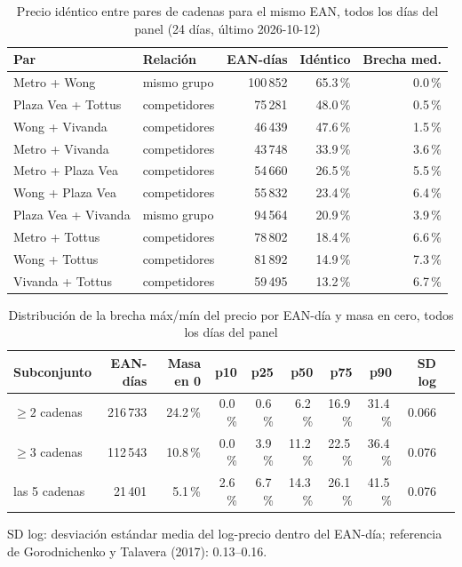 
\begin{table}[htbp]
\caption{Precio id\'entico entre pares de cadenas para el mismo EAN, todos los d\'ias del panel (24 d\'ias, \'ultimo 2026-10-12)}
\label{tab:identidad}
\centering\scriptsize\setlength{\tabcolsep}{3pt}
\begin{tabular}{@{}llrrr@{}}
\toprule
Par & Relaci\'on & EAN-d\'ias & Id\'entico & Brecha med. \\
\midrule
Metro + Wong & mismo grupo & 100\,852 & 65.3\,\% & 0.0\,\% \\
Plaza Vea + Tottus & competidores & 75\,281 & 48.0\,\% & 0.5\,\% \\
Wong + Vivanda & competidores & 46\,439 & 47.6\,\% & 1.5\,\% \\
Metro + Vivanda & competidores & 43\,748 & 33.9\,\% & 3.6\,\% \\
Metro + Plaza Vea & competidores & 54\,660 & 26.5\,\% & 5.5\,\% \\
Wong + Plaza Vea & competidores & 55\,832 & 23.4\,\% & 6.4\,\% \\
Plaza Vea + Vivanda & mismo grupo & 94\,564 & 20.9\,\% & 3.9\,\% \\
Metro + Tottus & competidores & 78\,802 & 18.4\,\% & 6.6\,\% \\
Wong + Tottus & competidores & 81\,892 & 14.9\,\% & 7.3\,\% \\
Vivanda + Tottus & competidores & 59\,495 & 13.2\,\% & 6.7\,\% \\
\bottomrule\end{tabular}\end{table}

\begin{table}[t]
\caption{Distribuci\'on de la brecha m\'ax/m\'in del precio por EAN-d\'ia y masa en cero, todos los d\'ias del panel}
\label{tab:brecha}
\centering\scriptsize\setlength{\tabcolsep}{4pt}
\begin{tabular}{@{}lrrrrrrrrr@{}}
\toprule
Subconjunto & EAN-d\'ias & Masa en 0 & p10 & p25 & p50 & p75 & p90 & SD log \\
\midrule
$\geq 2$ cadenas & 216\,733 & 24.2\,\% & 0.0\,\% & 0.6\,\% & 6.2\,\% & 16.9\,\% & 31.4\,\% & 0.066 \\
$\geq 3$ cadenas & 112\,543 & 10.8\,\% & 0.0\,\% & 3.9\,\% & 11.2\,\% & 22.5\,\% & 36.4\,\% & 0.076 \\
las 5 cadenas & 21\,401 & 5.1\,\% & 2.6\,\% & 6.7\,\% & 14.3\,\% & 26.1\,\% & 41.5\,\% & 0.076 \\
\bottomrule\end{tabular}
\par\smallskip\raggedright\scriptsize SD log: desviaci\'on est\'andar media del log-precio dentro del EAN-d\'ia; referencia de Gorodnichenko y Talavera (2017): 0.13--0.16.
\end{table}

